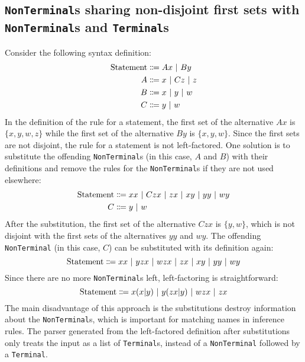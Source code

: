 \subsection{\texorpdfstring{\lstinline{NonTerminal}}{NonTerminal}s sharing non-disjoint first sets with \texorpdfstring{\lstinline{NonTerminal}}{NonTerminal}s and \texorpdfstring{\lstinline{Terminal}}{Terminal}s}
\label{syntax:factorisation:nonterm}
Consider the following syntax definition:
\begin{align*}
    \text{Statement} &\Coloneqq Ax \ |\  By \\ 
    A &\Coloneqq x \ |\  Cz \ |\  z \\
    B &\Coloneqq x \ |\  y \ |\  w \\
    C &\Coloneqq y \ |\  w
\end{align*}
In the definition of the rule for a statement, the first set of the alternative $Ax$ is $\{ x, y, w, z \}$ while the first set of the alternative $By$ is $\{ x, y, w \}$. Since the first sets are not disjoint, the rule for a statement is not left-factored. One solution is to substitute the offending \lstinline{NonTerminal}s (in this case, $A$ and $B$) with their definitions and remove the rules for the \lstinline{NonTerminal}s if they are not used elsewhere:
\begin{align*}
    \text{Statement} &\Coloneqq xx \ |\  Czx \ |\  zx \ |\  xy \ |\  yy \ |\  wy \\
    C &\Coloneqq y \ |\  w
\end{align*}
After the substitution, the first set of the alternative $Czx$ is $\{ y, w \}$, which is not disjoint with the first sets of the alternatives $yy$ and $wy$. The offending \lstinline{NonTerminal} (in this case, $C$) can be substituted with its definition again:
\[
    \text{Statement} \Coloneqq xx \ |\  yzx \ |\  wzx \ |\  zx \ |\  xy \ |\  yy \ |\  wy
\]
Since there are no more \lstinline{NonTerminal}s left, left-factoring is straightforward:
\[
    \text{Statement} \Coloneqq x(x|y) \ |\  y(zx|y) \ |\  wzx \ |\  zx
\]
The main disadvantage of this approach is the substitutions destroy information about the \lstinline{NonTerminal}s, which is important for matching names in inference rules. The parser generated from the left-factored definition after substitutions only treats the input as a list of \lstinline{Terminal}s, instead of a \lstinline{NonTerminal} followed by a \lstinline{Terminal}.

